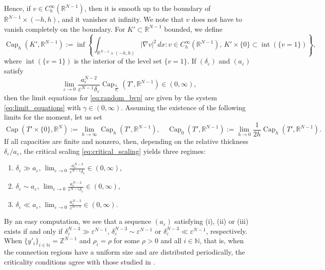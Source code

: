 \documentclass{article}
\numberwithin{equation}{section}
\theoremstyle{definition}
\theoremstyle{remark}
\newcommand{\cpct}{\operatorname{Cap}}
\newcommand{\topint}{\operatorname{int}}
\begin{document}
Hence, if $v \in C_h^\infty(\mathbb{R}^{N - 1})$, then it is smooth up to the boundary of $\mathbb{R}^{N - 1} \times (-h, h)$, and it vanishes at infinity. We note that $v$ does not have to vanish completely on the boundary. For $K' \subset \mathbb{R}^{N - 1}$ bounded, we define
\begin{equation} \label{eq:height_dependent_capacity}
    \cpct_h(K', \mathbb{R}^{N - 1}) := \inf \left\{\int_{\mathbb{R}^{N - 1} \times (-h, h)} |\nabla v|^2 \, dx : v \in C_h^\infty(\mathbb{R}^{N - 1}), \, K' \times \{0\} \subset \topint(\{v = 1\}) \right\},
\end{equation}
where $\topint(\{v = 1\})$ is the interior of the level set $\{v = 1\}$. If $(\delta_\varepsilon)$ and $(a_\varepsilon)$ satisfy
\begin{equation} \label{eq:critical_scaling}
    \lim_{\varepsilon \to 0} \frac{a_\varepsilon^{N - 2}}{\varepsilon^{N - 1} \delta_\varepsilon} \cpct_{\frac{\delta_\varepsilon}{a_\varepsilon}}(T', \mathbb{R}^{N - 1}) \in (0, \infty),
\end{equation}
then the limit equations for \eqref{eq:random_bvp} are given by the system \eqref{eq:limit_equations} with $\gamma \in (0, \infty)$. Assuming the existence of the following limits for the moment, let us set
\begin{equation} \label{eq:a_bunch_of_capacities}
    \cpct(T' \times \{0\}, \mathbb{R}^N) := \lim_{h \to \infty} \cpct_h(T', \mathbb{R}^{N - 1}), \quad \cpct_0(T', \mathbb{R}^{N - 1}) := \lim_{h \to 0} \frac{1}{2h} \cpct_h(T', \mathbb{R}^{N - 1}).
\end{equation}
If all capacities are finite and nonzero, then, depending on the relative thickness $\delta_\varepsilon/a_\varepsilon$, the critical scaling \eqref{eq:critical_scaling} yields three regimes:
\begin{enumerate}[label=(\roman*)]
    \item $\delta_\varepsilon \gg a_\varepsilon$, \quad $\lim_{\varepsilon \to 0} \frac{a_\varepsilon^{N - 2}}{\varepsilon^{N - 1} \delta_\varepsilon} \in (0, \infty)$,
    \item $\delta_\varepsilon \sim a_\varepsilon$, \quad $\lim_{\varepsilon \to 0} \frac{a_\varepsilon^{N - 2}}{\varepsilon^{N - 1} \delta_\varepsilon} \in (0, \infty)$,
    \item  $\delta_\varepsilon \ll a_\varepsilon$, \quad $\lim_{\varepsilon \to 0} \frac{a_\varepsilon^{N - 3}}{\varepsilon^{N - 1}} \in (0, \infty)$.
\end{enumerate}
By an easy computation, we see that a sequence $(a_\varepsilon)$ satisfying (i), (ii) or (iii) exists if and only if $\delta_\varepsilon^{N - 3} \gg \varepsilon^{N - 1}$, $\delta_\varepsilon^{N - 3} \sim \varepsilon^{N - 1}$ or $\delta_\varepsilon^{N - 3} \ll \varepsilon^{N - 1}$, respectively. When $\{y'_i\}_{i \in \mathbb{N}} = \mathbb{Z}^{N - 1}$ and $\rho_i = \rho$ for some $\rho > 0$ and all $i \in \mathbb{N}$, that is, when the connection regions have a uniform size and are distributed periodically, the criticality conditions agree with those studied in \cite{N, ABZ}.
\end{document}
